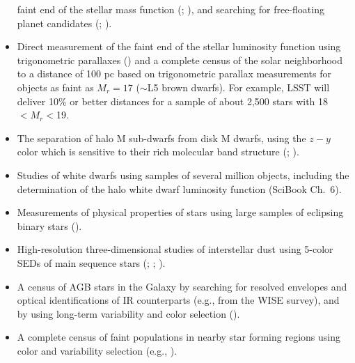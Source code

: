 \begin{itemize}
          faint end of the stellar mass function (\cite{2008AJ....135.2177L}; \cite{2010AJ....140..844F}), and searching for
          free-floating planet candidates (\cite{2000MNRAS.314..858L}; \cite{2014ApJ...786L..18L}).
\item Direct measurement of the faint end of the stellar luminosity function
          using trigonometric parallaxes (\cite{2002AJ....124.2721R}) and a complete census of the
          solar neighborhood to a distance of 100 pc based on trigonometric parallax measurements for objects as faint as
          $M_r=17$ ($\sim$L5 brown dwarfs). For example, LSST will deliver 10\% or better distances for a sample of about 2,500 stars
          with 18$<M_r<$19. %
\item The separation of halo M sub-dwarfs from disk M dwarfs, using the $z-y$ color which is sensitive to their rich molecular band
          structure (\cite{2011ASPC..448..531W}; \cite{2013AJ....145...40B}).
\item Studies of white dwarfs using samples of several million objects, including the determination of the halo white dwarf luminosity
          function (SciBook Ch.~6).
\item Measurements of physical properties of stars using large samples of eclipsing binary stars (\cite{2013AAS...22111601S}).
\item High-resolution three-dimensional studies of interstellar dust using 5-color
          SEDs of main sequence stars (\cite{2011A&A...536A..23P}; \cite{2012ApJ...757..166B}; \cite{2014ApJ...783..114G}).
\item A census of AGB stars in the Galaxy by searching for resolved envelopes and optical  identifications of IR counterparts
         (e.g., from the WISE survey), and by using long-term variability and color selection (\cite{2007ASPC..378..485I}).
\item A complete census of faint populations in nearby star forming regions using
          color and variability selection (e.g., \cite{2005AJ....129..907B}).
\end{itemize}


